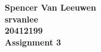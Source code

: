 \documentclass[12pt]{article}
\begin{document}
\begin{center}
{\Large\bf Spencer Van Leeuwen} \\ \vspace{2mm}
{\Large\bf srvanlee} \\ \vspace{2mm}
{\Large\bf 20412199} \\ \vspace{2mm}
{\Large\bf Assignment 3}
\end{center}
\end{document}
